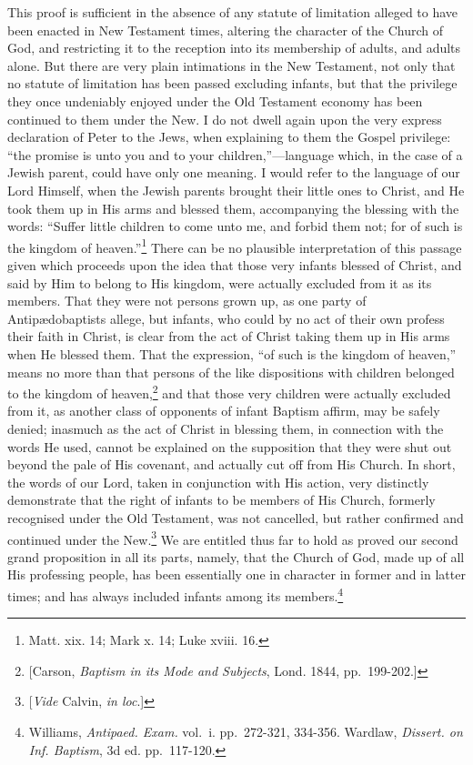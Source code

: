 \documentclass[english,]{book}
\begin{document}
This proof is sufficient in the absence of any statute of limitation alleged to have been enacted in New Testament times, altering the character of the Church of God, and restricting it to the reception into its membership of adults, and adults alone. But there are very plain intimations in the New Testament, not only that no statute of limitation has been passed excluding infants, but that the privilege they once undeniably enjoyed under the Old Testament economy has been continued to them under the New. I do not dwell again upon the very express declaration of Peter to the Jews, when explaining to them the Gospel privilege: ``the promise is unto you and to your children,''---language which, in the case of a Jewish parent, could have only one meaning. I would refer to the language of our Lord Himself, when the Jewish parents brought their little ones to Christ, and He took them up in His arms and blessed them, accompanying the blessing with the words: ``Suffer little children to come unto me, and forbid them not; for of such is the kingdom of heaven.''\footnote{Matt. xix. 14; Mark x. 14; Luke xviii. 16.} There can be no plausible interpretation of this passage given which proceeds upon the idea that those very infants blessed of Christ, and said by Him to belong to His kingdom, were actually excluded from it as its members. That they were not persons grown up, as one party of Antipædobaptists allege, but infants, who could by no act of their own profess their faith in Christ, is clear from the act of Christ taking them up in His arms when He blessed them. That the expression, ``of such is the kingdom of heaven,'' means no more than that persons of the like dispositions with children belonged to the kingdom of heaven,\footnote{{[}Carson, \emph{Baptism in its Mode and Subjects}, Lond. 1844, pp.~199-202.{]}} and that those very children were actually excluded from it, as another class of opponents of infant Baptism affirm, may be safely denied; inasmuch as the act of Christ in blessing them, in connection with the words He used, cannot be explained on the supposition that they were shut out beyond the pale of His covenant, and actually cut off from His Church. In short, the words of our Lord, taken in conjunction with His action, very distinctly demonstrate that the right of infants to be members of His Church, formerly recognised under the Old Testament, was not cancelled, but rather confirmed and continued under the New.\footnote{{[}\emph{Vide} Calvin, \emph{in loc}.{]}} We are entitled thus far to hold as proved our second grand proposition in all its parts, namely, that the Church of God, made up of all His professing people, has been essentially one in character in former and in latter times; and has always included infants among its members.\footnote{Williams, \emph{Antipaed. Exam.} vol.~i. pp.~272-321, 334-356. Wardlaw, \emph{Dissert. on Inf. Baptism}, 3d ed. pp.~117-120.}
\end{document}
